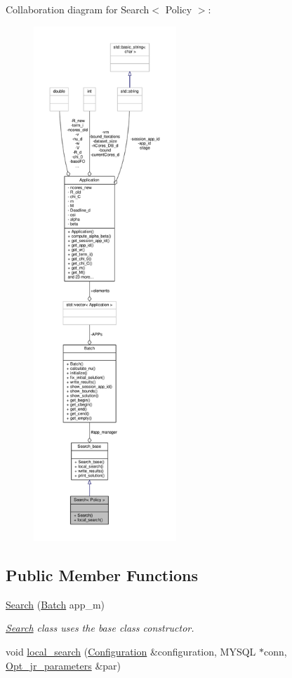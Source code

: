 Collaboration diagram for Search$<$ Policy $>$\-:
\nopagebreak
\begin{figure}[H]
\begin{center}
\leavevmode
\includegraphics[height=550pt]{classSearch__coll__graph}
\end{center}
\end{figure}
\subsection*{Public Member Functions}
\begin{DoxyCompactItemize}
\item 
\hyperlink{classSearch_a59b826749138fdaa93c41b1e0697da58}{Search} (\hyperlink{classBatch}{Batch} app\-\_\-m)
\begin{DoxyCompactList}\small\item\em \hyperlink{classSearch}{Search} class uses the base class constructor. \end{DoxyCompactList}\item 
void \hyperlink{classSearch_a32d434fae76c18149f8b15aedadc5f75}{local\-\_\-search} (\hyperlink{classConfiguration}{Configuration} \&configuration, M\-Y\-S\-Q\-L $\ast$conn, \hyperlink{classOpt__jr__parameters}{Opt\-\_\-jr\-\_\-parameters} \&par)
\end{DoxyCompactItemize}
